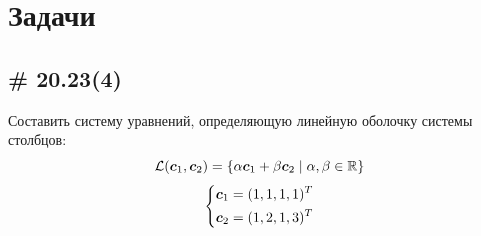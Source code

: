 \documentclass[a4paper,12pt]{article}
\begin{document}
  
  \section{Задачи}
  
  \subsection{\# 20.23(4)}
  
  Составить систему уравнений, определяющую линейную оболочку системы столбцов:
  \[
    \mathcal L(\boldsymbol c_1, \boldsymbol c_2) = \{\alpha \boldsymbol c_1 + \beta \boldsymbol c_2 \mid \alpha, \beta \in \operatorname{\mathbb R}\}
  \]
  \[
    \left\{
      \begin{aligned}
        &\boldsymbol c_1 = (1, 1, 1, 1)^T\\
        &\boldsymbol c_2 = (1, 2, 1, 3)^T
      \end{aligned}
    \right.
  \]
  
\end{document}
